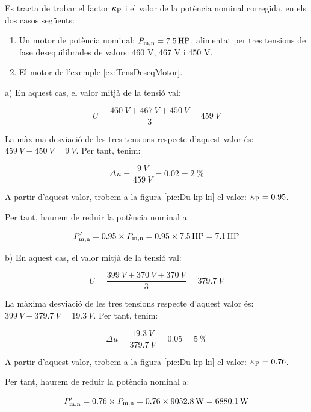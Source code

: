 \begin{exemple}[\MotorTensDeseqNEMA{}]
	\addcontentsxms{\MotorTensDeseqNEMA}
Es tracta de trobar el factor $\kappa_\mathrm{P}$  i el valor de la potència nominal corregida, en els dos casos següents:	
    \begin{enumerate}
		\renewcommand{\labelenumi}{\alph{enumi})}
		\item Un motor de  potència nominal: $P_\mathrm{m,n} = \qty{7,5}{HP}$, alimentat per tres tensions de fase desequilibrades   de valors: 460 V, 467 V i 450 V.
		
		\item El motor de l'exemple \vref{ex:TensDeseqMotor}.
	\end{enumerate}
	
	a)  En aquest cas, el valor mitjà de la tensió val:
	
    \[
      \bar{U} = \frac{\qty{460}{V}+\qty{467}{V}+\qty{450}{V}}{3} = \qty{459}{V}
    \]

    La màxima desviació de les tres tensions respecte d'aquest valor és: $\qty{459}{V}-\qty{450}{V} = \qty{9}{V}$. Per tant, tenim:
    
    \[
        \Delta u = \frac{\qty{9}{V}}{\qty{459}{V}} = \num{0,02} = \qty{2}{\%}
    \]

     A partir d'aquest valor, trobem a la figura \vref{pic:Du-kp-ki} el valor:  $\kappa_\mathrm{P} = \num{0,95}$.

     Per tant, haurem de reduir la potència nominal a:
     
     \[
         P'_\mathrm{m,n} = \num{0,95}\times{}P_\mathrm{m,n}  = \num{0,95}\times\qty{7,5}{HP} = \qty{7,1}{HP}
     \]
     
	 b)  En aquest cas, el valor mitjà de la tensió val:
	 
	 \[
	 \bar{U} = \frac{\qty{399}{V}+\qty{370}{V}+\qty{370}{V}}{3} = \qty{379,7}{V}
	 \]
	 
	 La màxima desviació de les tres tensions respecte d'aquest valor és: $\qty{399}{V}-\qty{379,7}{V} = \qty{19,3}{V}$. Per tant, tenim:
	 
	 \[
	 \Delta u = \frac{\qty{19,3}{V}}{\qty{379,7}{V}} = \num{0,05} = \qty{5}{\%}
	 \]
	 
	 A partir d'aquest valor, trobem a la figura \ref{pic:Du-kp-ki} el valor:  $\kappa_\mathrm{P} = \num{0,76}$.    
     
     Per tant, haurem de reduir la potència nominal a:
     
     \[
     P'_\mathrm{m,n} = \num{0,76}\times{}P_\mathrm{m,n}  = \num{0,76}\times\qty{9052,8}{W} = \qty{6880,1}{W}
     \]
\end{exemple}

